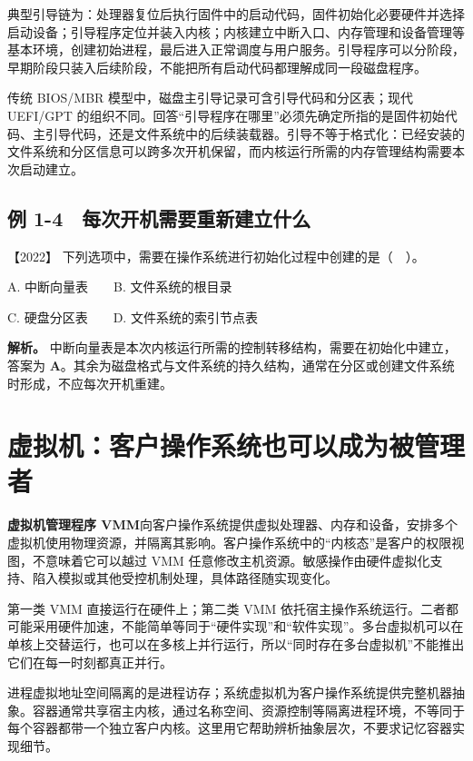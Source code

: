 典型引导链为：处理器复位后执行固件中的启动代码，固件初始化必要硬件并选择启动设备；引导程序定位并装入内核；内核建立中断入口、内存管理和设备管理等基本环境，创建初始进程，最后进入正常调度与用户服务。引导程序可以分阶段，早期阶段只装入后续阶段，不能把所有启动代码都理解成同一段磁盘程序。

传统 BIOS/MBR 模型中，磁盘主引导记录可含引导代码和分区表；现代 UEFI/GPT 的组织不同。回答``引导程序在哪里''必须先确定所指的是固件初始代码、主引导代码，还是文件系统中的后续装载器。引导不等于格式化：已经安装的文件系统和分区信息可以跨多次开机保留，而内核运行所需的内存管理结构需要本次启动建立。

\subsection{例 1-4　每次开机需要重新建立什么}\label{os-ex1-4}

\noindent{}【2022】 下列选项中，需要在操作系统进行初始化过程中创建的是（　）。

A. 中断向量表　　B. 文件系统的根目录

C. 硬盘分区表　　D. 文件系统的索引节点表


\textbf{解析。} 中断向量表是本次内核运行所需的控制转移结构，需要在初始化中建立，答案为 \textbf{A}。其余为磁盘格式与文件系统的持久结构，通常在分区或创建文件系统时形成，不应每次开机重建。

\section{虚拟机：客户操作系统也可以成为被管理者}\label{os-1-10}

\textbf{虚拟机管理程序 VMM}向客户操作系统提供虚拟处理器、内存和设备，安排多个虚拟机使用物理资源，并隔离其影响。客户操作系统中的``内核态''是客户的权限视图，不意味着它可以越过 VMM 任意修改主机资源。敏感操作由硬件虚拟化支持、陷入模拟或其他受控机制处理，具体路径随实现变化。

第一类 VMM 直接运行在硬件上；第二类 VMM 依托宿主操作系统运行。二者都可能采用硬件加速，不能简单等同于``硬件实现''和``软件实现''。多台虚拟机可以在单核上交替运行，也可以在多核上并行运行，所以``同时存在多台虚拟机''不能推出它们在每一时刻都真正并行。

进程虚拟地址空间隔离的是进程访存；系统虚拟机为客户操作系统提供完整机器抽象。容器通常共享宿主内核，通过名称空间、资源控制等隔离进程环境，不等同于每个容器都带一个独立客户内核。这里用它帮助辨析抽象层次，不要求记忆容器实现细节。


